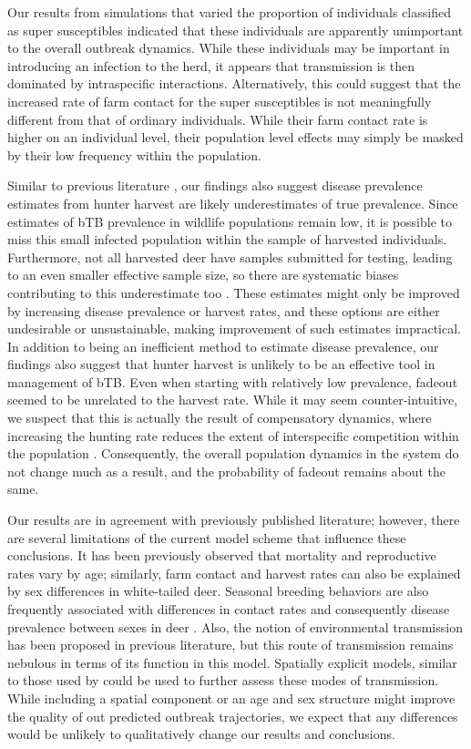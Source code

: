 \documentclass[number,preprint,review,12pt]{elsarticle}
\begin{document}
Our results from simulations that varied the proportion of individuals classified as super susceptibles indicated that these individuals are apparently unimportant to the overall outbreak dynamics. While these individuals may be important in introducing an infection to the herd, it appears that transmission is then dominated by intraspecific interactions. Alternatively, this could suggest that the increased rate of farm contact for the super susceptibles is not meaningfully different from that of ordinary individuals. While their farm contact rate is higher on an individual level, their population level effects may simply be masked by their low frequency within the population.


Similar to previous literature \citet{Obrien2004, Palmer1999}, our findings also suggest disease prevalence estimates from hunter harvest are likely underestimates of true prevalence. Since estimates of bTB prevalence in wildlife populations remain low, it is possible to miss this small infected population within the sample of harvested individuals. Furthermore, not all harvested deer have samples submitted for testing, leading to an even smaller effective sample size, so there are systematic biases contributing to this underestimate too \citep{Obrien2004}. These estimates might only be improved by increasing disease prevalence or harvest rates, and these options are either undesirable or unsustainable, making improvement of such estimates impractical. In addition to being an inefficient method to estimate disease prevalence, our findings also suggest that hunter harvest is unlikely to be an effective tool in management of bTB. Even when starting with relatively low prevalence, fadeout seemed to be unrelated to the harvest rate. While it may seem counter-intuitive, we suspect that this is actually the result of compensatory dynamics, where increasing the hunting rate reduces the extent of interspecific competition within the population \citep{comp_dynamics}. Consequently, the overall population dynamics in the system do not change much as a result, and the probability of fadeout remains about the same.

Our results are in agreement with previously published literature; however, there are several limitations of the current model scheme that influence these conclusions. It has been previously observed that mortality and reproductive rates vary by age; similarly, farm contact and harvest rates can also be explained by sex differences in white-tailed deer\citep{repro_1999}. Seasonal breeding behaviors are also frequently associated with differences in contact rates and consequently disease prevalence between sexes in deer \citep{rogers2022}. Also, the notion of environmental transmission has been proposed in previous literature, but this route of transmission remains nebulous in terms of its function in this model. Spatially explicit models, similar to those used by \citet{Ramsey2010, ramsey2014} could be used to further assess these modes of transmission. While including a spatial component or an age and sex structure might improve the quality of out predicted outbreak trajectories, we expect that any differences would be unlikely to qualitatively change our results and conclusions.
\end{document}
